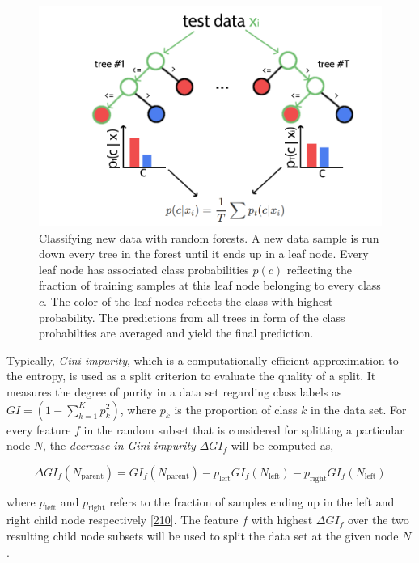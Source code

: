 \documentclass[11pt,a4paper,twoside]{book}
\theoremstyle{definition}
\theoremstyle{definition}
\theoremstyle{remark}
\begin{document}
\begin{figure}

{\centering \includegraphics[width=0.8\linewidth]{img/random_forest_contact_prior/intro_random_forest} 

}

\caption{Classifying new data with random forests. A new
data sample is run down every tree in the forest until it ends up in a
leaf node. Every leaf node has associated class probabilities \(p(c)\)
reflecting the fraction of training samples at this leaf node belonging
to every class \(c\). The color of the leaf nodes reflects the class
with highest probability. The predictions from all trees in form of the
class probabilties are averaged and yield the final prediction.}\label{fig:rf-intro}
\end{figure}

Typically, \emph{Gini impurity}, which is a computationally efficient
approximation to the entropy, is used as a split criterion to evaluate
the quality of a split. It measures the degree of purity in a data set
regarding class labels as \(GI = (1 - \sum_{k=1}^K p_k^2)\), where
\(p_k\) is the proportion of class \(k\) in the data set. For every
feature \(f\) in the random subset that is considered for splitting a
particular node \(N\), the \emph{decrease in Gini impurity}
\(\Delta GI_f\) will be computed as,

\[
\Delta GI_f(N_{\textrm{parent}}) = GI_f(N_{\textrm{parent}}) - p_{\textrm{left}} GI_f(N_{\textrm{left}}) - p_{\textrm{right}} GI_f(N_{\textrm{left}})
\]

where \(p_{\textrm{left}}\) and \(p_{\textrm{right}}\) refers to the
fraction of samples ending up in the left and right child node
respectively {[}\protect\hyperlink{ref-Menze2009}{210}{]}. The feature
\(f\) with highest \(\Delta GI_f\) over the two resulting child node
subsets will be used to split the data set at the given node \(N\).
\end{document}
